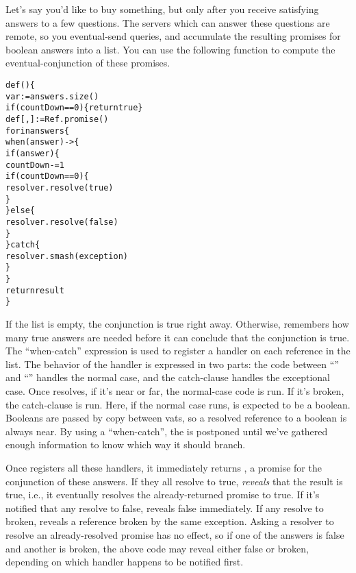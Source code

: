 \documentclass{llncs}
\begin{document}
Let's say you'd like to buy something, but only after you receive
satisfying answers to a few questions. The servers which can answer
these questions are remote, so you eventual-send queries, and
accumulate the resulting promises for boolean answers into a list. You
can use the following  function to compute the
eventual-conjunction of these promises.
%
\begin{alltt}
    def () \{
        var  := answers.size()
        if (countDown == 0) \{ return true \}
        def [, ] := Ref.promise()
        for  in answers \{
            when (answer) -> \{
                if (answer) \{
                    countDown -= 1
                    if (countDown == 0) \{
                        resolver.resolve(true) 
                    \}
                \} else \{
                    resolver.resolve(false)
                \}
            \} catch  \{
                resolver.smash(exception)
            \}
        \}
        return result
    \}
\end{alltt}
%
If the list is empty, the conjunction is true right away. Otherwise,
 remembers how many true answers are needed before it
can conclude that the conjunction is true. The ``when-catch''
expression is used to register a handler on each reference in the
list. The behavior of the handler is expressed in two parts: the code
between ``\code{->~\{}'' and ``'' handles the normal
case, and the catch-clause handles the exceptional case. Once
 resolves, if it's near or far, the normal-case code is
run. If it's broken, the catch-clause is run.  Here, if the normal
case runs,  is expected to be a boolean. Booleans are
passed by copy between vats, so a resolved reference to a boolean is
always near. By using a ``when-catch'', the  is postponed
until we've gathered enough information to know which way it should
branch.

Once  registers all these handlers, it immediately
returns , a promise for the conjunction of these
answers. If they all resolve to true,  \emph{reveals}
that the result is true, i.e., it eventually resolves the
already-returned promise to true. If it's notified that any resolve to
false,  reveals false immediately. If any resolve to
broken,  reveals a reference broken by the same
exception. Asking a resolver to resolve an already-resolved promise
has no effect, so if one of the answers is false and another is broken,
the above  code may reveal either false or broken,
depending on which handler happens to be notified first.
\end{document}
